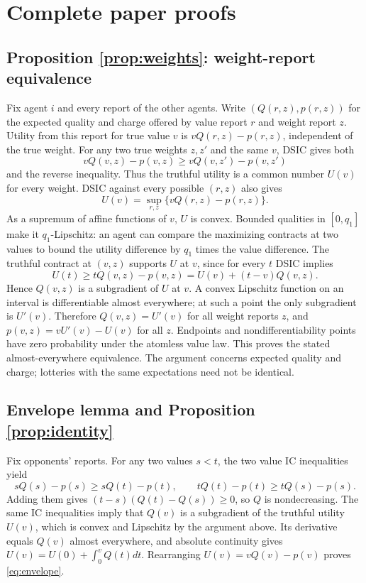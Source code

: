 \documentclass[11pt]{article}
\begin{document}
\appendix
\section{Complete paper proofs}\label{app:proofs}

\subsection{Proposition \ref{prop:weights}: weight-report equivalence}

Fix agent $i$ and every report of the other agents. Write $(Q(r,z),p(r,z))$ for the expected quality and charge offered by value report $r$ and weight report $z$. Utility from this report for true value $v$ is $vQ(r,z)-p(r,z)$, independent of the true weight. For any two true weights $z,z'$ and the same $v$, DSIC gives both
\[
vQ(v,z)-p(v,z)\ge vQ(v,z')-p(v,z')
\]
and the reverse inequality. Thus the truthful utility is a common number $U(v)$ for every weight. DSIC against every possible $(r,z)$ also gives
\[
U(v)=\sup_{r,z}\{vQ(r,z)-p(r,z)\}.
\]
As a supremum of affine functions of $v$, $U$ is convex. Bounded qualities in $[0,q_1]$ make it $q_1$-Lipschitz: an agent can compare the maximizing contracts at two values to bound the utility difference by $q_1$ times the value difference. The truthful contract at $(v,z)$ supports $U$ at $v$, since for every $t$ DSIC implies
\[
U(t)\ge tQ(v,z)-p(v,z)=U(v)+(t-v)Q(v,z).
\]
Hence $Q(v,z)$ is a subgradient of $U$ at $v$. A convex Lipschitz function on an interval is differentiable almost everywhere; at such a point the only subgradient is $U'(v)$. Therefore $Q(v,z)=U'(v)$ for all weight reports $z$, and $p(v,z)=vU'(v)-U(v)$ for all $z$. Endpoints and nondifferentiability points have zero probability under the atomless value law. This proves the stated almost-everywhere equivalence. The argument concerns expected quality and charge; lotteries with the same expectations need not be identical.

\subsection{Envelope lemma and Proposition \ref{prop:identity}}

Fix opponents' reports. For any two values $s<t$, the two value IC inequalities yield
\[
sQ(s)-p(s)\ge sQ(t)-p(t),\qquad
tQ(t)-p(t)\ge tQ(s)-p(s).
\]
Adding them gives $(t-s)(Q(t)-Q(s))\ge0$, so $Q$ is nondecreasing. The same IC inequalities imply that $Q(v)$ is a subgradient of the truthful utility $U(v)$, which is convex and Lipschitz by the argument above. Its derivative equals $Q(v)$ almost everywhere, and absolute continuity gives $U(v)=U(0)+\int_0^vQ(t)dt$. Rearranging $U(v)=vQ(v)-p(v)$ proves \eqref{eq:envelope}.
\end{document}
